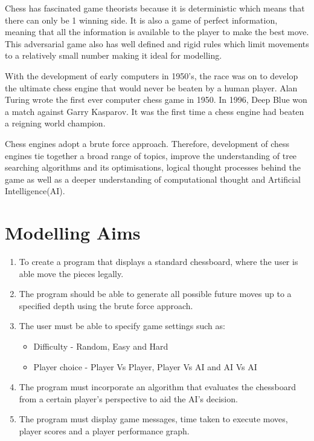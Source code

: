 \documentclass[11pt,a4paper]{article}
\begin{document}
Chess has fascinated game theorists because it is deterministic which means that there can only be 1 winning side. It is also a game of perfect information, meaning that all the information is available to the player to make the best move. This adversarial game also has well defined and rigid rules which limit movements to a relatively small number making it ideal for modelling.\cite{chess1}
 
With the development of early computers in 1950’s, the race was on to develop the ultimate chess engine that would never be beaten by a human player. Alan Turing wrote the first ever computer chess game in 1950. In 1996, Deep Blue won a match against Garry Kasparov. It was the first time a chess engine had beaten a reigning world champion.
 
Chess engines adopt a brute force approach. Therefore, development of chess engines tie together a broad range of topics, improve the understanding of tree searching algorithms and its optimisations, logical thought processes behind the game as well as a deeper understanding of computational thought and Artificial Intelligence(AI).



\newpage
\section{Modelling Aims}

\begin{enumerate}
\item To create a program that displays a standard chessboard, where the user is able move the pieces legally.
\item The program should be able to generate all possible future moves up to a specified depth using the brute force approach.
\item The user must be able to specify game settings such as: 

\begin{itemize}
\item Difficulty - Random, Easy and Hard
\item Player choice - Player Vs Player, Player Vs AI and AI Vs AI
\end{itemize}

\item The program must incorporate an algorithm that evaluates the chessboard from a certain player’s perspective to aid the AI’s decision.
\item The program must display game messages, time taken to execute moves, player scores and a player performance graph.
\end{enumerate}
\end{document}
